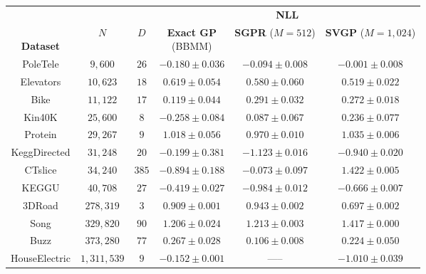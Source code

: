 \begin{tabular}{ cccccc }
  \toprule
  &&&
	\multicolumn{3}{c}{{\bf NLL}}  \\
  \cmidrule{4-6}
  \thead{\\{\bf Dataset}} & \thead{\\$N$} & \thead{\\$D$} &
  \thead{{\bf Exact GP} \\ (BBMM)} & \thead{{\bf SGPR} \\ ($M\!=\!512$)} & \thead{{\bf SVGP} \\ ($M\!=\!1,\!024$)}
  \\
  \midrule
	PoleTele             & $9,\!600$          & $26$  &    $\mathbf{-0.180}\pm 0.036$ &   $-0.094\pm 0.008$            &    $-0.001\pm 0.008$           \\
	Elevators            & $10,\!623$         & $18$  &    $0.619\pm 0.054$           &   $0.580\pm 0.060$             &     $\mathbf{0.519}\pm 0.022$  \\
	Bike                 & $11,\!122$         & $17$  &    $\mathbf{0.119}\pm 0.044$  &   $0.291\pm 0.032$             &     $0.272\pm 0.018$           \\
	Kin40K               & $25,\!600$         & $8$   &    $\mathbf{-0.258}\pm 0.084$ &   $0.087\pm 0.067$             &     $0.236\pm 0.077$           \\
	Protein              & $29,\!267$         & $9$   &    $1.018\pm 0.056$           &   $\mathbf{0.970}\pm 0.010$    &     $1.035\pm 0.006$           \\
	KeggDirected         & $31,\!248$         & $20$  &    $-0.199\pm 0.381$          &   $\mathbf{-1.123}\pm 0.016$   &    $-0.940\pm 0.020$           \\
	CTslice              & $34,\!240$         & $385$ &    $\mathbf{-0.894}\pm 0.188$ &   $-0.073\pm 0.097$            &     $1.422\pm 0.005$           \\
	KEGGU                & $40,\!708$         & $27$  &    $-0.419\pm 0.027$          &   $\mathbf{-0.984}\pm 0.012$   &    $-0.666\pm 0.007$           \\
	3DRoad               & $278,\!319$        & $3$   &    $0.909\pm 0.001$           &   $0.943\pm 0.002$             &     $\mathbf{0.697}\pm 0.002$  \\
	Song                 & $329,\!820$        & $90$  &    $\mathbf{1.206}\pm 0.024$  &   $1.213\pm 0.003$             &     $1.417\pm 0.000$           \\
	Buzz                 & $373,\!280$        & $77$  &    $0.267\pm 0.028$           &   $\mathbf{0.106}\pm 0.008$    &     $0.224\pm 0.050$           \\
	HouseElectric        & $1,\!311,\!539$    & $9$   &    $\mathbf{-0.152}\pm 0.001$ &   -----                        &    $-1.010\pm 0.039$           \\
  \bottomrule
\end{tabular}

